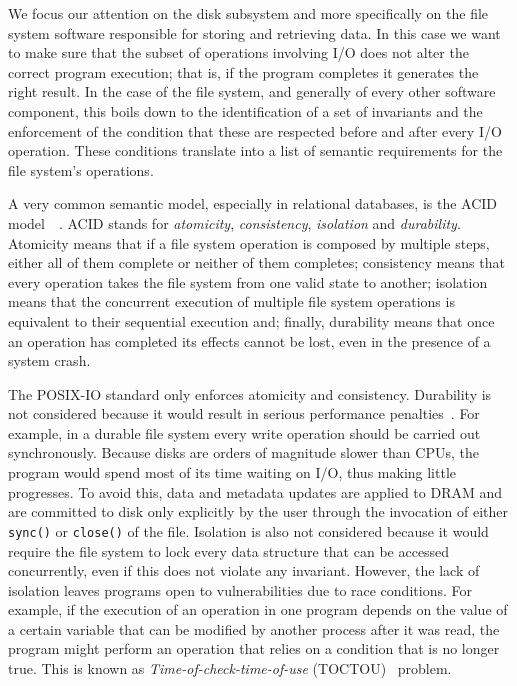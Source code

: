 We focus our attention on the disk subsystem and more specifically on the file system software responsible for storing and retrieving data. In this case we want to make sure that the subset of operations involving I/O 
does not alter the correct program execution; that is, if the program completes it generates the right result. In the case of the file system, and generally of every other software component, this boils down to 
the identification of a set of invariants and the enforcement of the condition that these are respected before and after every I/O operation. These conditions translate into a list of semantic requirements for the
file system's operations. 

A very common semantic model, especially in relational databases, is the ACID model~\cite{Gray1981}~\cite{Wright2007}. ACID stands for \textit{atomicity}, \textit{consistency}, \textit{isolation} and \textit{durability}. 
Atomicity means that if a file system operation is composed by multiple steps, either all of them complete or neither of them completes; consistency means that every operation takes the file system from one valid 
state to another; isolation means that the concurrent execution of multiple file system operations is equivalent to their sequential execution and; finally, durability means that once an operation has completed its 
effects cannot be lost, even in the presence of a system crash.

The POSIX-IO standard only enforces atomicity and consistency. Durability is not considered because it would result in serious performance penalties~\cite{Wright2007}. For example, in a durable file system every write operation should be
carried out synchronously. Because disks are orders of magnitude slower than CPUs, the program would spend most of its time waiting on I/O, thus making little progresses. To avoid this, data and metadata updates are 
applied to DRAM and are committed to disk only explicitly by the user through the invocation of either \texttt{sync()} or \texttt{close()} of the file. Isolation is also not considered because it would require the file 
system to lock every data structure that can be accessed concurrently, even if this does not violate any invariant. However, the lack of isolation leaves programs open to vulnerabilities due to race conditions. For example, 
if the execution of an operation in one program depends on the value of a certain variable that can be modified by another process after it was read, the program might perform an operation that relies on a condition that 
is no longer true. This is known as \textit{Time-of-check-time-of-use} (TOCTOU)~\cite{Wright2007} problem.


